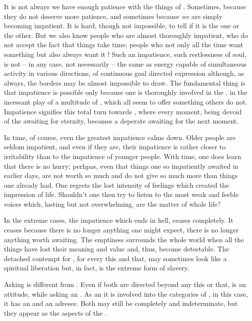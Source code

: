 \subpa 
It is not always we have enough patience with the things of
.  Sometimes, because they do not deserve more
patience, and sometimes because {\em we} are simply becoming
impatient.  It is hard, though not impossible, to tell if it is the
one or the other.  But we also know people who are almost thoroughly
impatient, who do not accept the fact that things take time; people
who not only all the time want something but also always want it
!  Such an impatience, such restlessness of soul, is not -- in
any case, not necessarily -- the same as energy capable of
simultaneous activity in various directions, of continuous goal
directed expression although, as always, the  borders may
be almost impossible to draw. The fundamental thing is that impatience 
is possible only because one is thoroughly involved in the , in the incessant play of a multitude of , 
which all seem to offer something others do not. Impatience signifies 
this total turn towards , where every moment, being 
devoid of the awaiting for eternity, becomes a deperate awaiting for 
the next moment.

\subpa 
In time, of course, even the greatest impatience calms down. 
Older people are seldom impatient, and even if they are, their
impatience is rather closer to irritability than to the impatience of
younger people.  With time, one does learn that there is no hurry;
perhpas, even that things one so impatiently awaited in earlier days,
are not worth so much and do not give so much more than things one
already had.  One regrets the lost intensity of feelings which created
the impression of life.  Shouldn't one then try to listen to the most
weak and feeble voices which, lasting but not overwhelming, are the
matter of whole life?

\subpa
In the extreme cases, the impatience which ends in hell, 
ceases completely. It ceases because there is no longer anything one 
might expect, there is no longer anything worth awaiting. The emptiness 
surrounds the whole world when all the things have lost their 
meaning and value and, thus, become detestable. The 
detached contempt for , for every this and that, may 
sometimes look like a spiritual liberation but, in fact, is the 
extreme form of slavery.


Asking is different from . Even if both are directed 
beyond any this or that,  is an 
attitude, while asking an . As an  it is involved into 
the categories of , in this case, it has an  
and an adresee. Both may still be completely  and 
indeterminate, but they appear as the aspects of the .

